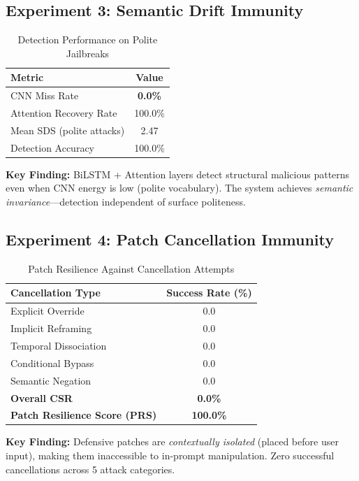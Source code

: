 \documentclass[11pt,twocolumn]{article}
\begin{document}
\subsection{Experiment 3: Semantic Drift Immunity}

\begin{table}[h]
\centering
\caption{Detection Performance on Polite Jailbreaks}
\begin{tabular}{@{}lc@{}}
\toprule
\textbf{Metric} & \textbf{Value} \\
\midrule
CNN Miss Rate & \textbf{0.0\%} \\
Attention Recovery Rate & 100.0\% \\
Mean SDS (polite attacks) & 2.47 \\
Detection Accuracy & 100.0\% \\
\bottomrule
\end{tabular}
\end{table}

\textbf{Key Finding:} BiLSTM + Attention layers detect structural malicious patterns even when CNN energy is low (polite vocabulary). The system achieves \textit{semantic invariance}—detection independent of surface politeness.

\subsection{Experiment 4: Patch Cancellation Immunity}

\begin{table}[h]
\centering
\caption{Patch Resilience Against Cancellation Attempts}
\begin{tabular}{@{}lc@{}}
\toprule
\textbf{Cancellation Type} & \textbf{Success Rate (\%)} \\
\midrule
Explicit Override & 0.0 \\
Implicit Reframing & 0.0 \\
Temporal Dissociation & 0.0 \\
Conditional Bypass & 0.0 \\
Semantic Negation & 0.0 \\
\midrule
\textbf{Overall CSR} & \textbf{0.0\%} \\
\textbf{Patch Resilience Score (PRS)} & \textbf{100.0\%} \\
\bottomrule
\end{tabular}
\end{table}

\textbf{Key Finding:} Defensive patches are \textit{contextually isolated} (placed before user input), making them inaccessible to in-prompt manipulation. Zero successful cancellations across 5 attack categories.
\end{document}
